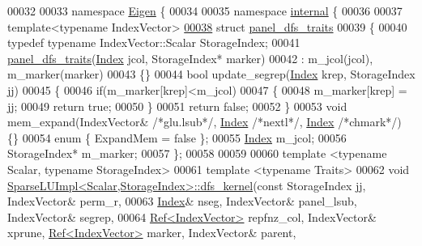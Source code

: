 \begin{DoxyCode}
00032 
00033 \textcolor{keyword}{namespace }\hyperlink{namespace_eigen}{Eigen} \{
00034 
00035 \textcolor{keyword}{namespace }\hyperlink{namespaceinternal}{internal} \{
00036   
00037 \textcolor{keyword}{template}<\textcolor{keyword}{typename} IndexVector>
\hyperlink{struct_eigen_1_1internal_1_1panel__dfs__traits}{00038} \textcolor{keyword}{struct }\hyperlink{struct_eigen_1_1internal_1_1panel__dfs__traits}{panel\_dfs\_traits}
00039 \{
00040   \textcolor{keyword}{typedef} \textcolor{keyword}{typename} IndexVector::Scalar StorageIndex;
00041   \hyperlink{struct_eigen_1_1internal_1_1panel__dfs__traits}{panel\_dfs\_traits}(\hyperlink{namespace_eigen_a62e77e0933482dafde8fe197d9a2cfde}{Index} jcol, StorageIndex* marker)
00042     : m\_jcol(jcol), m\_marker(marker)
00043   \{\}
00044   \textcolor{keywordtype}{bool} update\_segrep(\hyperlink{namespace_eigen_a62e77e0933482dafde8fe197d9a2cfde}{Index} krep, StorageIndex jj)
00045   \{
00046     \textcolor{keywordflow}{if}(m\_marker[krep]<m\_jcol)
00047     \{
00048       m\_marker[krep] = jj; 
00049       \textcolor{keywordflow}{return} \textcolor{keyword}{true};
00050     \}
00051     \textcolor{keywordflow}{return} \textcolor{keyword}{false};
00052   \}
00053   \textcolor{keywordtype}{void} mem\_expand(IndexVector& \textcolor{comment}{/*glu.lsub*/}, \hyperlink{namespace_eigen_a62e77e0933482dafde8fe197d9a2cfde}{Index} \textcolor{comment}{/*nextl*/}, \hyperlink{namespace_eigen_a62e77e0933482dafde8fe197d9a2cfde}{Index} \textcolor{comment}{/*chmark*/}) \{\}
00054   \textcolor{keyword}{enum} \{ ExpandMem = \textcolor{keyword}{false} \};
00055   \hyperlink{namespace_eigen_a62e77e0933482dafde8fe197d9a2cfde}{Index} m\_jcol;
00056   StorageIndex* m\_marker;
00057 \};
00058 
00059 
00060 \textcolor{keyword}{template} <\textcolor{keyword}{typename} Scalar, \textcolor{keyword}{typename} StorageIndex>
00061 \textcolor{keyword}{template} <\textcolor{keyword}{typename} Traits>
00062 \textcolor{keywordtype}{void} \hyperlink{group___sparse_l_u___module_class_eigen_1_1internal_1_1_sparse_l_u_impl}{SparseLUImpl<Scalar,StorageIndex>::dfs\_kernel}(\textcolor{keyword}{const} 
      StorageIndex jj, IndexVector& perm\_r,
00063                    \hyperlink{namespace_eigen_a62e77e0933482dafde8fe197d9a2cfde}{Index}& nseg, IndexVector& panel\_lsub, IndexVector& segrep,
00064                    \hyperlink{group___core___module_class_eigen_1_1_ref}{Ref<IndexVector>} repfnz\_col, IndexVector& xprune, 
      \hyperlink{group___core___module_class_eigen_1_1_ref}{Ref<IndexVector>} marker, IndexVector& parent,

\end{DoxyCode}

